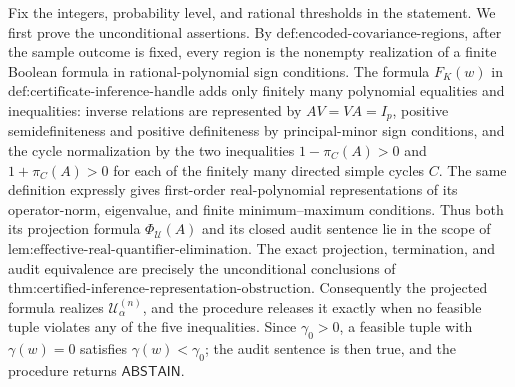 Fix the integers, probability level, and rational thresholds in the statement. We first prove the unconditional assertions. By \(\text{def:encoded-covariance-regions}\), after the sample outcome is fixed, every region is the nonempty realization of a finite Boolean formula in rational-polynomial sign conditions. The formula \(F_K(w)\) in \(\text{def:certificate-inference-handle}\) adds only finitely many polynomial equalities and inequalities: inverse relations are represented by \(AV=VA=I_p\), positive semidefiniteness and positive definiteness by principal-minor sign conditions, and the cycle normalization by the two inequalities \(1-\pi_C(A)>0\) and \(1+\pi_C(A)>0\) for each of the finitely many directed simple cycles \(C\). The same definition expressly gives first-order real-polynomial representations of its operator-norm, eigenvalue, and finite minimum--maximum conditions. Thus both its projection formula \(\Phi_{\mathcal U}(A)\) and its closed audit sentence lie in the scope of \(\text{lem:effective-real-quantifier-elimination}\). The exact projection, termination, and audit equivalence are precisely the unconditional conclusions of \(\text{thm:certified-inference-representation-obstruction}\). Consequently the projected formula realizes \(\mathcal U^{(n)}_\alpha\), and the procedure releases it exactly when no feasible tuple violates any of the five inequalities. Since \(\gamma_0>0\), a feasible tuple with \(\gamma(w)=0\) satisfies \(\gamma(w)<\gamma_0\); the audit sentence is then true, and the procedure returns \(\mathsf{ABSTAIN}\).

